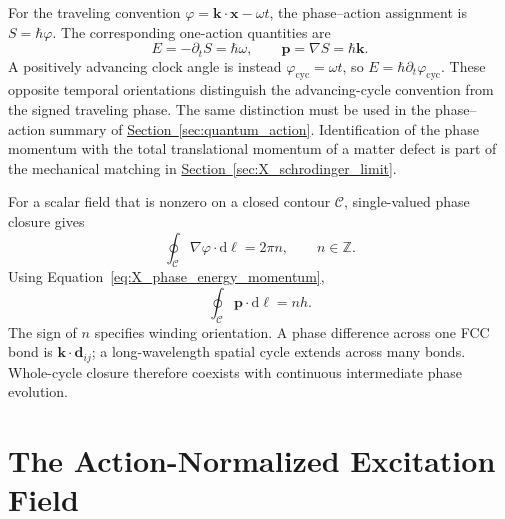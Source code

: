 For the traveling convention $\varphi=\mathbf k\cdot\mathbf x-\omega t$, the phase--action assignment is $S=\hbar\varphi$. The corresponding one-action quantities are
\begin{equation}
    \boxed{
    E=-\partial_tS=\hbar\omega,
    \qquad
    \mathbf p=\nabla S=\hbar\mathbf k
    }.
    \label{eq:X_phase_energy_momentum}
\end{equation}
A positively advancing clock angle is instead $\varphi_{\mathrm{cyc}}=\omega t$, so $E=\hbar\partial_t\varphi_{\mathrm{cyc}}$. These opposite temporal orientations distinguish the advancing-cycle convention from the signed traveling phase. The same distinction must be used in the phase--action summary of \hyperref[sec:quantum_action]{Section~\ref*{sec:quantum_action}}. Identification of the phase momentum with the total translational momentum of a matter defect is part of the mechanical matching in \hyperref[sec:X_schrodinger_limit]{Section~\ref*{sec:X_schrodinger_limit}}.

For a scalar field that is nonzero on a closed contour $\mathcal C$, single-valued phase closure gives
\begin{equation}
    \oint_{\mathcal C}\nabla\varphi\cdot\mathrm d\boldsymbol\ell
    =2\pi n,
    \qquad n\in\mathbb Z.
\end{equation}
Using Equation~\eqref{eq:X_phase_energy_momentum},
\begin{equation}
    \boxed{
    \oint_{\mathcal C}\mathbf p\cdot\mathrm d\boldsymbol\ell=nh
    }.
    \label{eq:X_winding_action}
\end{equation}
The sign of $n$ specifies winding orientation. A phase difference across one FCC bond is $\mathbf k\cdot\mathbf d_{ij}$; a long-wavelength spatial cycle extends across many bonds. Whole-cycle closure therefore coexists with continuous intermediate phase evolution.

\section{The Action-Normalized Excitation Field}

